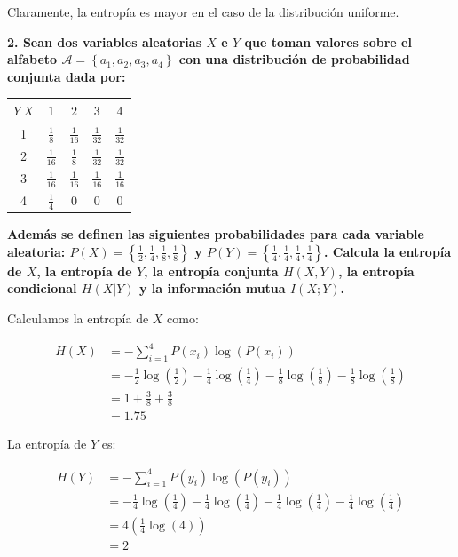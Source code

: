 \documentclass{article}
\begin{document}
Claramente, la entropía es mayor en el caso de la distribución uniforme.

\vspace{1cm}

\textbf{
2. Sean dos variables aleatorias $X$ e $Y$ que toman valores sobre el alfabeto $\mathcal{A} = \left\{a_1,a_2,a_3,a_4\right\}$ con una distribución de probabilidad conjunta dada por:
}

\begin{table}[htbp!]
\centering
\begin{tabular}{|c|c|c|c|c|}
    \hline
    $Y \ X$ & $1$ & $2$ & $3$ & $4$ \\
    \hline
    1 & $\frac{1}{8}$ & $\frac{1}{16}$ & $\frac{1}{32}$ & $\frac{1}{32}$ \\
    2 & $\frac{1}{16}$ & $\frac{1}{8}$ & $\frac{1}{32}$ & $\frac{1}{32}$ \\
    3 & $\frac{1}{16}$ & $\frac{1}{16}$ & $\frac{1}{16}$ & $\frac{1}{16}$ \\
    4 & $\frac{1}{4}$ & $0$ & $0$ & $0$ \\
    \hline
\end{tabular}
\end{table}


\textbf{
Además se definen las siguientes probabilidades para cada variable aleatoria: $P(X) = \left\{\frac{1}{2},\frac{1}{4},\frac{1}{8},\frac{1}{8}\right\}$ y $P(Y) = \left\{\frac{1}{4},\frac{1}{4},\frac{1}{4},\frac{1}{4}\right\}$. Calcula la entropía de $X$, la entropía de $Y$, la entropía conjunta $H(X,Y)$, la entropía condicional $H(X|Y)$ y la información mutua $I(X;Y)$.
}

\vspace{0.5cm}

Calculamos la entropía de $X$ como:

\begin{align*}
    H(X) &= -\sum_{i=1}^{4}P(x_i)\log\left(P(x_i)\right)\\
    &= -\frac{1}{2}\log\left(\frac{1}{2}\right) - \frac{1}{4}\log\left(\frac{1}{4}\right) - \frac{1}{8}\log\left(\frac{1}{8}\right) - \frac{1}{8}\log\left(\frac{1}{8}\right)\\
    &= 1 + \frac{3}{8} + \frac{3}{8}\\
    &= 1.75
\end{align*}

La entropía de $Y$ es:

\begin{align*}
    H(Y) &= -\sum_{i=1}^{4}P(y_i)\log\left(P(y_i)\right)\\
    &= -\frac{1}{4}\log\left(\frac{1}{4}\right) - \frac{1}{4}\log\left(\frac{1}{4}\right) - \frac{1}{4}\log\left(\frac{1}{4}\right) - \frac{1}{4}\log\left(\frac{1}{4}\right)\\
    &= 4\left(\frac{1}{4}\log\left(4\right)\right)\\
    &= 2
\end{align*}
\end{document}
